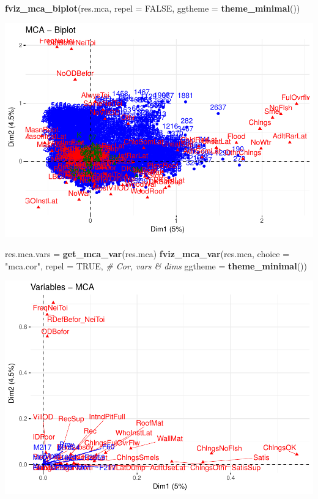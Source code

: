 \documentclass[11pt,]{article}
\newenvironment{Shaded}{\begin{snugshade}}{\end{snugshade}}
\newcommand{\CommentTok}[1]{\textcolor[rgb]{0.56,0.35,0.01}{\textit{#1}}}
\newcommand{\DataTypeTok}[1]{\textcolor[rgb]{0.13,0.29,0.53}{#1}}
\newcommand{\KeywordTok}[1]{\textcolor[rgb]{0.13,0.29,0.53}{\textbf{#1}}}
\newcommand{\NormalTok}[1]{#1}
\newcommand{\OtherTok}[1]{\textcolor[rgb]{0.56,0.35,0.01}{#1}}
\newcommand{\StringTok}[1]{\textcolor[rgb]{0.31,0.60,0.02}{#1}}
\begin{document}
\begin{Shaded}
\begin{Highlighting}[]
\KeywordTok{fviz_mca_biplot}\NormalTok{(res.mca, }\DataTypeTok{repel =} \OtherTok{FALSE}\NormalTok{, }\DataTypeTok{ggtheme =} \KeywordTok{theme_minimal}\NormalTok{())}
\end{Highlighting}
\end{Shaded}

\includegraphics{describe_FSMintentions_regional_seasonal_iDE-Camb_surveysOct2017_files/figure-latex/MCA_results-2.pdf}

\begin{Shaded}
\begin{Highlighting}[]
\NormalTok{res.mca.vars =}\StringTok{ }\KeywordTok{get_mca_var}\NormalTok{(res.mca)}
\KeywordTok{fviz_mca_var}\NormalTok{(res.mca, }\DataTypeTok{choice =} \StringTok{"mca.cor"}\NormalTok{, }\DataTypeTok{repel =} \OtherTok{TRUE}\NormalTok{,      }\CommentTok{# Cor, vars & dims}
             \DataTypeTok{ggtheme =} \KeywordTok{theme_minimal}\NormalTok{())}
\end{Highlighting}
\end{Shaded}

\includegraphics{describe_FSMintentions_regional_seasonal_iDE-Camb_surveysOct2017_files/figure-latex/MCA_results-3.pdf}
\end{document}

